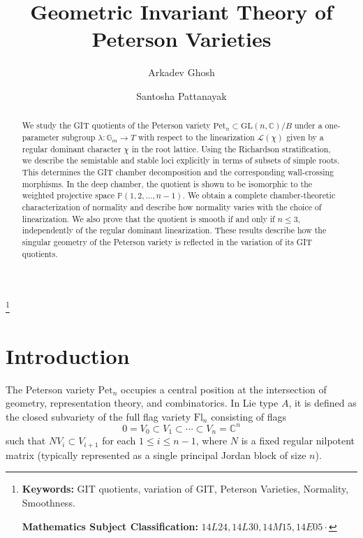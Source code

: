 \documentclass[12pt, reqno]{amsart}
\title{Geometric Invariant Theory of Peterson Varieties}
\author[A.~Ghosh]{Arkadev Ghosh}
\author[S.~Pattanayak]{Santosha Pattanayak}
\theoremstyle{plain}
\numberwithin{equation}{section}
\theoremstyle{definition}
\newcommand\blfootnote[1]{%
  \begingroup
  \renewcommand\thefootnote{}\footnote{#1}%
  \addtocounter{footnote}{-1}%
  \endgroup
}
\begin{document}
\maketitle


\begin{abstract}
We study the GIT quotients of the Peterson variety
\(\mathrm{Pet}_n\subset \mathrm{GL}(n,\mathbb C)/B\) under a one-parameter subgroup $\lambda:\mathbb G_m \to T$ with respect to the linearization $\mathcal L(\chi)$ given by a regular dominant character $\chi$ in the root lattice. Using the Richardson stratification, we describe the semistable and 
stable loci explicitly in terms of subsets of simple
roots. This determines the GIT chamber decomposition and the
corresponding wall-crossing morphisms. In the deep chamber, the
quotient is shown to be isomorphic to the weighted projective space
\(\mathbb P(1,2,\ldots,n-1)\). We obtain a complete chamber-theoretic characterization of normality and describe how normality varies with the choice of linearization. We also
prove that the quotient is smooth if and only if \(n\le3\),
independently of the regular dominant linearization. These results
describe how the singular geometry of the Peterson variety is
reflected in the variation of its GIT quotients.
\end{abstract}

\blfootnote{{\bf Keywords:} GIT quotients, variation
of GIT, Peterson Varieties, Normality, Smoothness.

{\bf Mathematics Subject Classification:} $14L24, 14L30, 14M15, 14E05·$}


\section{Introduction}

The Peterson variety $\mathrm{Pet}_n$ occupies a central position at the intersection of geometry, representation theory, and combinatorics. In Lie type $A$, it is defined as the closed subvariety of the full flag variety $\mathrm{Fl}_n$ consisting of flags 
\[
0 = V_0 \subset V_1 \subset \cdots \subset V_n = \mathbb{C}^n
\]
such that $N V_i \subset V_{i+1}$ for each $1 \leq i \leq n-1$, where $N$ is a fixed regular nilpotent matrix (typically represented as a single principal Jordan block of size $n$). 
\end{document}
